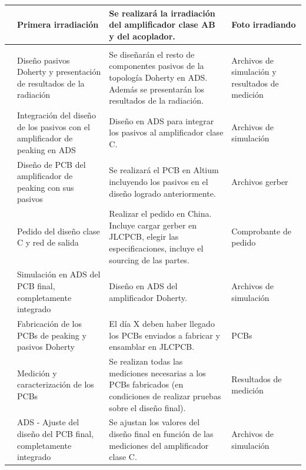 \begin{xltabular}{\textwidth}{>{\centering\arraybackslash}p{0.4cm} X X p{2.5cm}}
     & Primera irradiación & Se realizará la irradiación del amplificador clase AB y del acoplador. & Foto irradiando \\
    
    \hline
      \\
    
     & Diseño pasivos Doherty y presentación de resultados de la radiación & Se diseñarán el resto de componentes pasivos de la topología Doherty en ADS. Además se presentarán los resultados de la radiación. & Archivos de simulación y resultados de medición \\
    
     & Integración del diseño de los pasivos con el amplificador de peaking en ADS & Diseño en ADS para integrar los pasivos al amplificador clase C. & Archivos de simulación \\
    
     & Diseño de PCB del amplificador de peaking con sus pasivos & Se realizará el PCB en Altium incluyendo los pasivos en el diseño logrado anteriormente. & Archivos gerber \\
    
     & Pedido del diseño clase C y red de salida & Realizar el pedido en China. Incluye cargar gerber en JLCPCB, elegir las especificaciones, incluye el sourcing de las partes. & Comprobante de pedido \\
    
     & Simulación en ADS del PCB final, completamente integrado & Diseño en ADS del amplificador Doherty. & Archivos de simulación \\
    
     & Fabricación de los PCBs de peaking y pasivos Doherty & El día X deben haber llegado los PCBs enviados a fabricar y ensamblar en JLCPCB. & PCBs \\
    
     & Medición y caracterización de los PCBs & Se realizan todas las mediciones necesarias a los PCBs fabricados (en condiciones de realizar pruebas sobre el diseño final). & Resultados de medición \\
    
     & ADS - Ajuste del diseño del PCB final, completamente integrado & Se ajustan los valores del diseño final en función de las mediciones del amplificador clase C. & Archivos de simulación \\
    

\end{xltabular}
